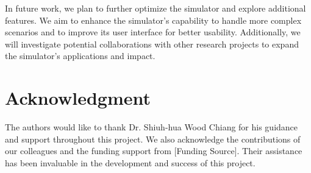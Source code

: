 \documentclass[conference]{IEEEtran}
\begin{document}
In future work, we plan to further optimize the simulator and explore additional features. We aim to enhance the simulator's capability to handle more complex scenarios and to improve its user interface for better usability. Additionally, we will investigate potential collaborations with other research projects to expand the simulator's applications and impact.

\section*{Acknowledgment}
The authors would like to thank Dr. Shiuh-hua Wood Chiang for his guidance and support throughout this project. We also acknowledge the contributions of our colleagues and the funding support from [Funding Source]. Their assistance has been invaluable in the development and success of this project.



\end{document}
